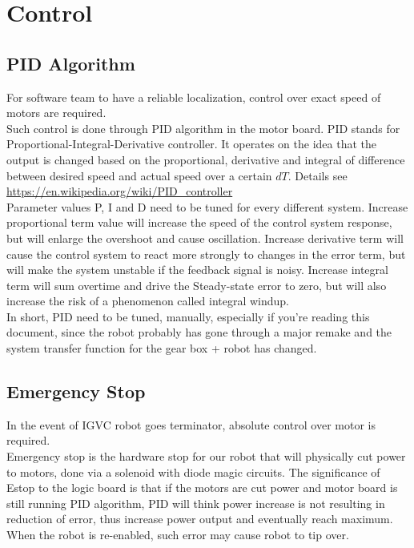 \documentclass[letterpaper, 12pt]{article}
\begin{document}
\section{Control}
\subsection{PID Algorithm}
For software team to have a reliable localization, control over exact speed of motors are required.\\

Such control is done through PID algorithm in the motor board. PID stands for Proportional-Integral-Derivative controller. It operates on the idea that the output is changed based on the proportional, derivative and integral of difference between desired speed and actual speed over a certain $dT$. Details see \url{https://en.wikipedia.org/wiki/PID_controller}\\

Parameter values P, I and D need to be tuned for every different system. Increase proportional term value will increase the speed of the control system response, but will enlarge the overshoot and cause oscillation. Increase derivative term will cause the control system to react more strongly to changes in the error term, but will make the system unstable if the feedback signal is noisy. Increase integral term will sum overtime and drive the Steady-state error to zero, but will also increase the risk of a phenomenon called integral windup. \\

In short, PID need to be tuned, manually, especially if you're reading this document, since the robot probably has gone through a major remake and the system transfer function for the gear box + robot has changed.

\subsection{Emergency Stop}
In the event of IGVC robot goes terminator, absolute control over motor is required.\\

Emergency stop is the hardware stop for our robot that will physically cut power to motors,
done via a solenoid with diode magic circuits. The significance of Estop to the logic board
is that if the motors are cut power and motor board is still running PID algorithm, PID will
think power increase is not resulting in reduction of error, thus increase power output and
eventually reach maximum. When the robot is re-enabled, such error may cause robot to tip over. \\
\end{document}
